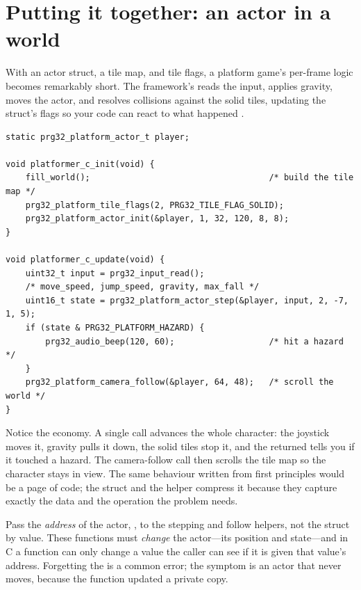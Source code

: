 \section{Putting it together: an actor in a world}

With an actor struct, a tile map, and tile flags, a platform game's per-frame
logic becomes remarkably short. The framework's 
reads the input, applies gravity, moves the actor, and resolves collisions against
the solid tiles, updating the struct's  flags so your code can react
to what happened \citep{prg32repo,prg32tutorialc}.

\begin{lstlisting}[style=c,caption={One frame of platform physics. The helper does the movement and collision; your code reads the resulting state.}]
static prg32_platform_actor_t player;

void platformer_c_init(void) {
    fill_world();                                    /* build the tile map */
    prg32_platform_tile_flags(2, PRG32_TILE_FLAG_SOLID);
    prg32_platform_actor_init(&player, 1, 32, 120, 8, 8);
}

void platformer_c_update(void) {
    uint32_t input = prg32_input_read();
    /* move_speed, jump_speed, gravity, max_fall */
    uint16_t state = prg32_platform_actor_step(&player, input, 2, -7, 1, 5);
    if (state & PRG32_PLATFORM_HAZARD) {
        prg32_audio_beep(120, 60);                   /* hit a hazard */
    }
    prg32_platform_camera_follow(&player, 64, 48);   /* scroll the world */
}
\end{lstlisting}

Notice the economy. A single call advances the whole character: the joystick moves
it, gravity pulls it down, the solid tiles stop it, and the returned 
tells you if it touched a hazard. The camera-follow call then scrolls the tile map
so the character stays in view. The same behaviour written from first principles
would be a page of code; the struct and the helper compress it because they capture
exactly the data and the operation the problem needs.

\begin{prgwarn}
Pass the \emph{address} of the actor, , to the stepping and
follow helpers, not the struct by value. These functions must \emph{change} the
actor---its position and state---and in C a function can only change a value the
caller can see if it is given that value's address. Forgetting the \code{\&} is a
common error; the symptom is an actor that never moves, because the function
updated a private copy.
\end{prgwarn}

